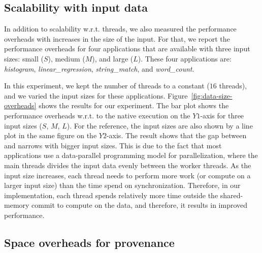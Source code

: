 \subsection{Scalability with input data}
\label{subsec:data-sizes-overheads}


 In addition to scalability w.r.t.  threads, we also measured the performance overheads with increases in the size of the input.  For that, we
report the performance overheads for four applications that are available with
three input sizes: small ($S$), medium ($M$), and large ($L$). These four applications are: {\em histogram}, {\em linear\_regression}, {\em string\_match}, and {\em word\_count}.

In this experiment, we kept the number of threads to a constant  ($16$ threads), and we varied the input sizes for these applications.  Figure~\ref{fig:data-size-overheads} shows the results for our experiment. The bar plot shows the performance overheads w.r.t. to the native \pthreads execution on the $Y1$-axis for three input sizes ($S$, $M$, $L$). For the reference, the input sizes are also shown by a line plot in the same figure on the $Y2$-axis. The result shows that the gap between \pthreads and \projecttitle narrows with bigger input sizes. This is due to the fact that most applications use a data-parallel programming model for parallelization, where the main threads divides the input data evenly between the worker threads. As the input size increases, each thread needs to perform more work (or compute on a larger input size) than the time spend on synchronization. Therefore, in our implementation, each thread spends relatively more time outside the shared-memory commit to compute on the data, and therefore, it results in improved performance.
 

%











\subsection{Space overheads for provenance}
\label{subsec:overheads-breakdown}

